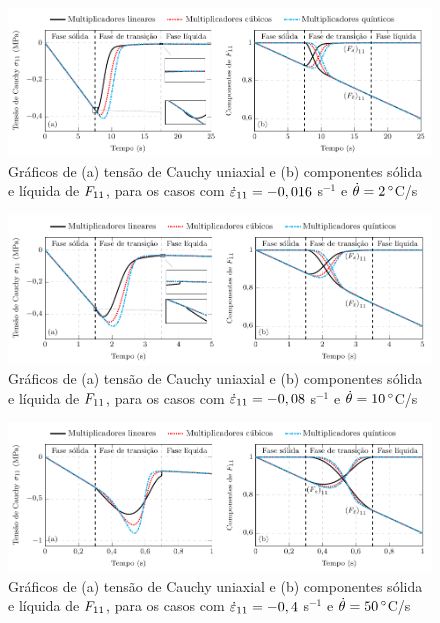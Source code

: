 \documentclass[Tese.tex]{subfiles}
\begin{document}
\begin{figure}[!htb]
	\centering
	\caption{Gráficos de (a) tensão de Cauchy uniaxial e (b) componentes sólida e líquida de $F_{11}$, para os casos com $\dot{{\varepsilon}}_{11} = -0,016$ s$^{-1}$ e $\dot{\theta} = 2\, ^{\circ}$C/s}
	\label{fig:PhaseChangeMonotonicStrainSolidToLiquid-t25}
	\includegraphics[scale=1.0]{Figuras/PhaseChangeMonotonic/PhaseChangeMonotonicStrainSolidToLiquid-t25.pdf}
\end{figure}

\begin{figure}[!htb]
	\centering
	\caption{Gráficos de (a) tensão de Cauchy uniaxial e (b) componentes sólida e líquida de $F_{11}$, para os casos com $\dot{{\varepsilon}}_{11} = -0,08$ s$^{-1}$ e $\dot{\theta} = 10\, ^{\circ}$C/s}
	\label{fig:PhaseChangeMonotonicStrainSolidToLiquid-t5}
	\includegraphics[scale=1.0]{Figuras/PhaseChangeMonotonic/PhaseChangeMonotonicStrainSolidToLiquid-t5.pdf}
\end{figure}

\begin{figure}[!htb]
	\centering
	\caption{Gráficos de (a) tensão de Cauchy uniaxial e (b) componentes sólida e líquida de $F_{11}$, para os casos com $\dot{{\varepsilon}}_{11} = -0,4$ s$^{-1}$ e $\dot{\theta} = 50\, ^{\circ}$C/s}
	\label{fig:PhaseChangeMonotonicStrainSolidToLiquid-t1}
	\includegraphics[scale=1.0]{Figuras/PhaseChangeMonotonic/PhaseChangeMonotonicStrainSolidToLiquid-t1.pdf}
\end{figure}
\end{document}
